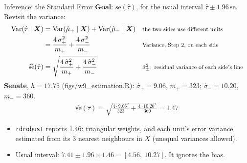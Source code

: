 \documentclass[aspectratio=169,11pt,xcolor=dvipsnames]{beamer}
\newcommand{\srcp}[1]{{\scriptsize\color{gray}(#1)}}
\DeclareMathOperator{\Var}{Var}
\begin{document}
\begin{frame}{Inference: the Standard Error}
\textbf{Goal}: $\text{se}(\hat\tau)$, for the usual interval $\hat\tau \pm 1.96\,\text{se}$.
Revisit the variance:
\begin{align*}
  \Var(\hat\tau\mid\bm X) &= \Var(\hat\mu_+\mid\bm X) + \Var(\hat\mu_-\mid\bm X)
   && \text{\footnotesize the two sides use different units} \\
  &= \frac{4\,\sigma_+^2}{m_+} + \frac{4\,\sigma_-^2}{m_-}
   && \text{\footnotesize Variance, Step 2, on each side} \\
  \widehat{\text{se}}(\hat\tau) &= \sqrt{\frac{4\,\hat\sigma_+^2}{m_+} + \frac{4\,\hat\sigma_-^2}{m_-}}
   && \text{\footnotesize $\hat\sigma_\pm^2$: residual variance of each side's line}
\end{align*}
\textbf{Senate}, $h = 17.75$ \srcp{figs/w9\_estimation.R}: $\hat\sigma_+ = 9.06$, $m_+ = 323$;
$\hat\sigma_- = 10.20$, $m_- = 360$.
\begin{align*}
  \widehat{\text{se}}(\hat\tau) = \sqrt{\frac{4 \cdot 9.06^2}{323} + \frac{4 \cdot 10.20^2}{360}} = 1.47
\end{align*}
\vskip-4pt
\begin{itemize}\itemsep2pt
  \item \texttt{rdrobust} reports 1.46: triangular weights, and each unit's error variance
        estimated from its 3 nearest neighbours in $X$ (unequal variances allowed).
  \item Usual interval: $7.41 \pm 1.96 \times 1.46 = [4.56,\ 10.27]$. \alert{It ignores the bias.}
\end{itemize}
\end{frame}
\end{document}
